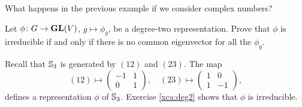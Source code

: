 What happens in the previous example if we consider complex numbers?

\begin{exercise}
  \label{xca:deg2}
  Let $\phi\colon G\to \mathbf{GL}(V)$, $g\mapsto\phi_g$, be a degree-two representation. Prove that
  $\phi$ is irreducible if and only if there is no common eigenvector for all the $\phi_g$.
\end{exercise}

\begin{example}
\label{exa:S3_deg2}
  Recall that $\mathbb{S}_3$ is generated by $(12)$ and $(23)$. The map 
  \[(12)\mapsto\begin{pmatrix}
    -1 & 1\\
    0 & 1
  \end{pmatrix},
  \quad
  (23)\mapsto\begin{pmatrix}
    1 & 0\\
    1 & -1
  \end{pmatrix},
  \]
  defines a representation $\phi$ of $\mathbb{S}_3$. 
  Exercise \ref{xca:deg2} shows that $\phi$ is  
  irreducible.
\end{example}